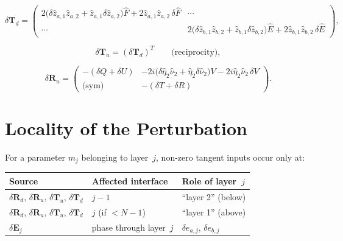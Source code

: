 \documentclass[11pt,a4paper]{article}
\newcommand{\dR}{\delta\mathbf{R}}
\newcommand{\dT}{\delta\mathbf{T}}
\newcommand{\dE}{\delta\mathbf{E}}
\theoremstyle{plain}
\theoremstyle{remark}
\begin{document}
\begin{equation}\label{eq:dTd}
  \dT_d = \begin{pmatrix}
    2\bigl(\delta\hat{z}_{a,1}\hat{z}_{a,2} + \hat{z}_{a,1}\delta\hat{z}_{a,2}\bigr)\hat{F}
    + 2\hat{z}_{a,1}\hat{z}_{a,2}\,\delta\hat{F}
    & \cdots \\[4pt]
    \cdots
    & 2\bigl(\delta\hat{z}_{b,1}\hat{z}_{b,2} + \hat{z}_{b,1}\delta\hat{z}_{b,2}\bigr)\hat{E}
    + 2\hat{z}_{b,1}\hat{z}_{b,2}\,\delta\hat{E}
  \end{pmatrix},
\end{equation}

\begin{equation}\label{eq:dTu}
  \dT_u = (\dT_d)^T \qquad\text{(reciprocity)},
\end{equation}

\begin{equation}\label{eq:dRu}
  \dR_u = \begin{pmatrix}
    -(\delta Q + \delta U)
    & -2i\bigl(\delta\hat\eta_2\hat\nu_2 + \hat\eta_2\delta\hat\nu_2\bigr)V
      - 2i\hat\eta_2\hat\nu_2\,\delta V \\[4pt]
    \text{(sym)}
    & -(\delta T + \delta R)
  \end{pmatrix}.
\end{equation}

\section{Locality of the Perturbation}\label{sec:locality}

For a parameter $m_j$ belonging to layer~$j$, non-zero tangent inputs occur
only at:

\begin{center}
\begin{tabular}{lll}
  \toprule
  \textbf{Source} & \textbf{Affected interface} & \textbf{Role of layer~$j$}\\
  \midrule
  $\dR_d,\,\dR_u,\,\dT_u,\,\dT_d$ & $j{-}1$ & ``layer 2'' (below)\\
  $\dR_d,\,\dR_u,\,\dT_u,\,\dT_d$ & $j$ (if $< N{-}1$) & ``layer 1'' (above)\\
  $\dE_j$ & phase through layer~$j$ & $\delta e_{a,j},\,\delta e_{b,j}$\\
  \bottomrule
\end{tabular}
\end{center}
\end{document}
